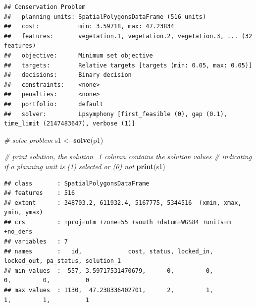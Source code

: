 \documentclass[
  12pt,
]{book}
\newenvironment{Shaded}{\begin{snugshade}}{\end{snugshade}}
\newcommand{\CommentTok}[1]{\textcolor[rgb]{0.56,0.35,0.01}{\textit{#1}}}
\newcommand{\DataTypeTok}[1]{\textcolor[rgb]{0.13,0.29,0.53}{#1}}
\newcommand{\FloatTok}[1]{\textcolor[rgb]{0.00,0.00,0.81}{#1}}
\newcommand{\KeywordTok}[1]{\textcolor[rgb]{0.13,0.29,0.53}{\textbf{#1}}}
\newcommand{\NormalTok}[1]{#1}
\newcommand{\OperatorTok}[1]{\textcolor[rgb]{0.81,0.36,0.00}{\textbf{#1}}}
\newcommand{\StringTok}[1]{\textcolor[rgb]{0.31,0.60,0.02}{#1}}
\begin{document}
\begin{Shaded}
\end{Shaded}

\begin{verbatim}
## Conservation Problem
##   planning units: SpatialPolygonsDataFrame (516 units)
##   cost:           min: 3.59718, max: 47.23834
##   features:       vegetation.1, vegetation.2, vegetation.3, ... (32 features)
##   objective:      Minimum set objective 
##   targets:        Relative targets [targets (min: 0.05, max: 0.05)]
##   decisions:      Binary decision 
##   constraints:    <none>
##   penalties:      <none>
##   portfolio:      default
##   solver:         Lpsymphony [first_feasible (0), gap (0.1), time_limit (2147483647), verbose (1)]
\end{verbatim}

\begin{Shaded}
\begin{Highlighting}[]
\CommentTok{# solve problem}
\NormalTok{s1 <-}\StringTok{ }\KeywordTok{solve}\NormalTok{(p1)}

\CommentTok{# print solution, the solution_1 column contains the solution values}
\CommentTok{# indicating if a planning unit is (1) selected or (0) not}
\KeywordTok{print}\NormalTok{(s1)}
\end{Highlighting}
\end{Shaded}

\begin{verbatim}
## class       : SpatialPolygonsDataFrame 
## features    : 516 
## extent      : 348703.2, 611932.4, 5167775, 5344516  (xmin, xmax, ymin, ymax)
## crs         : +proj=utm +zone=55 +south +datum=WGS84 +units=m +no_defs 
## variables   : 7
## names       :   id,             cost, status, locked_in, locked_out, pa_status, solution_1 
## min values  :  557, 3.59717531470679,      0,         0,          0,         0,          0 
## max values  : 1130,  47.238336402701,      2,         1,          1,         1,          1
\end{verbatim}
\end{document}

